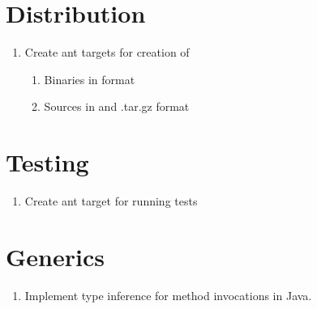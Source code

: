 \documentclass{article}
\begin{document}
\section{Distribution}
\begin{enumerate}
\item Create ant targets for creation of
\begin{enumerate}
\item Binaries in  format
\item Sources in  and {.tar.gz} format
\end{enumerate}
\end{enumerate}

\section{Testing}
\begin{enumerate}
\item Create ant target for running tests
\end{enumerate}

\section{Generics}
\begin{enumerate}
\item Implement type inference for method invocations in Java.
\end{enumerate}
\end{document}
